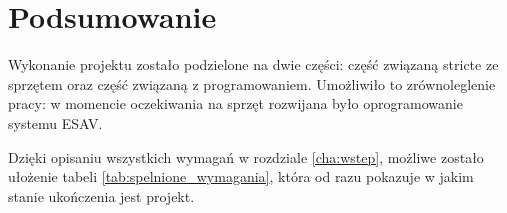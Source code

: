
\section{Podsumowanie}
\label{sec:podsumowanie_specyfikacja_projektu}

Wykonanie projektu zostało podzielone na dwie części: część związaną stricte ze sprzętem oraz część związaną z programowaniem. Umożliwiło to zrównoleglenie pracy: w momencie oczekiwania na sprzęt rozwijana było oprogramowanie systemu ESAV.

Dzięki opisaniu wszystkich wymagań w rozdziale \ref{cha:wstep}, możliwe zostało ułożenie tabeli \ref{tab:spelnione_wymagania}, która od razu pokazuje w jakim stanie ukończenia jest projekt.
